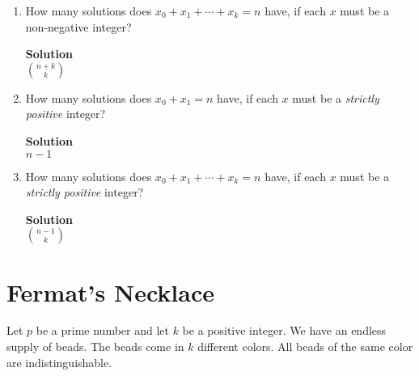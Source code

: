 \documentclass[11pt]{article}
\newcommand*{\Question}[1]{\section{#1}}
\newenvironment{Parts}{\begin{enumerate}[label=(\alph*)]}{\end{enumerate}}
\newcommand*{\Part}{\item}
\newenvironment{Answer}{\vspace{10pt}\begin{mdframed}\textbf{Solution}\\}{\end{mdframed}\vfill\pagebreak[3]}
\newenvironment{Answer}{\vspace{10pt}}{\vfill\pagebreak[3]}
\begin{document}
\begin{Parts}
\Part How many solutions does $x_0 + x_1 + \cdots + x_k = n$ have, if each $x$ must be a non-negative integer?
\begin{Answer}
$\binom{n+k}{k}$
\end{Answer}

\Part How many solutions does $x_0 + x_1 = n$ have, if each $x$ must be a \emph{strictly positive} integer?
\begin{Answer}
$n-1$
\end{Answer}

\Part How many solutions does $x_0 + x_1 + \cdots + x_k = n$ have, if each $x$ must be a \emph{strictly positive} integer?
\begin{Answer}
$\binom{n-1}{k}$
\end{Answer}

\end{Parts}


\Question{Fermat's Necklace}

  Let $p$ be a prime number and let $k$ be a positive integer.  We have an endless supply of beads. The beads come in
  $k$ different colors. All beads of the same color are indistinguishable.
\end{document}
